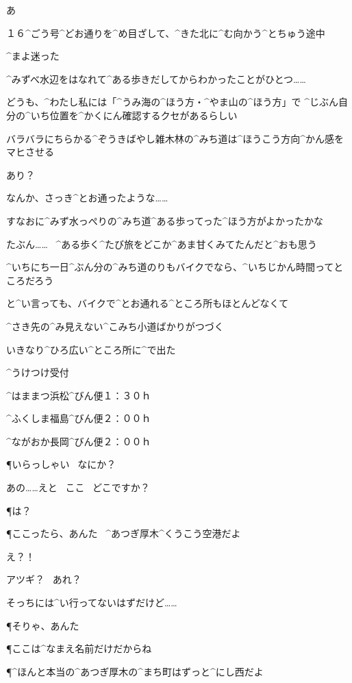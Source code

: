 \page[20]
\A あ

\A １６^{ごう}{号}^{どお}{通}りを^{め}{目}ざして、^{きた}{北}に^{む}{向}かう^{とちゅう}{途中}

\A ^{まよ}{迷}った

\page
\A ^{みずべ}{水辺}をはなれて^{ある}{歩}きだしてからわかったことがひとつ……

\A どうも、^{わたし}{私}には「^{うみ}{海}の^{ほう}{方}・^{やま}{山}の^{ほう}{方}」で
^{じぶん}{自分}の^{いち}{位置}を^{かくにん}{確認}するクセがあるらしい

\A バラバラにちらかる^{ぞうきばやし}{雑木林}の^{みち}{道}は^{ほうこう}{方向}^{かん}{感}をマヒさせる

\page
\A あり？

\A なんか、さっき^{とお}{通}ったような……

\A すなおに^{みず}{水}っぺりの^{みち}{道}^{ある}{歩}ってった^{ほう}{方}がよかったかな

\page
\A たぶん……
\ ^{ある}{歩}く^{たび}{旅}をどこか^{あま}{甘}くみてたんだと^{おも}{思}う

\A ^{いちにち}{一日}^{ぶん}{分}の^{みち}{道}のりもバイクでなら、^{いちじかん}{時間}ってところだろう

\page
\A と^{い}{言}っても、バイクで^{とお}{通}れる^{ところ}{所}もほとんどなくて

\A ^{さき}{先}の^{み}{見}えない^{こみち}{小道}ばかりがつづく

\page[29]
\A いきなり^{ひろ}{広}い^{ところ}{所}に^{で}{出}た

\page
\Sign ^{うけつけ}{受付}

\Sign ^{はままつ}{浜松}^{びん}{便}１：３０ｈ

\Sign ^{ふくしま}{福島}^{びん}{便}２：００ｈ

\Sign ^{ながおか}{長岡}^{びん}{便}２：００ｈ

\P いらっしゃい
\ なにか？

\A あの……えと
\ ここ
\ どこですか？

\P は？

\page
\P ここったら、あんた
\ ^{あつぎ}{厚木}^{くうこう}{空港}だよ

\A え？！

\A アツギ？
\ あれ？

\A そっちには^{い}{行}ってないはずだけど……

\P そりゃ、あんた

\P ここは^{なまえ}{名前}だけだからね

\P ^{ほんと}{本当}の^{あつぎ}{厚木}の^{まち}{町}はずっと^{にし}{西}だよ

